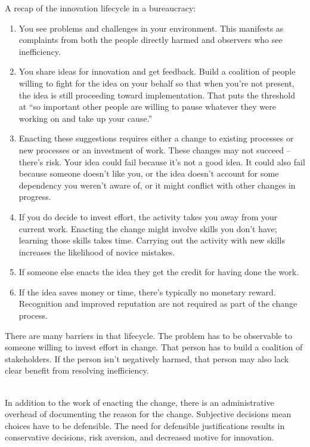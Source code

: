 A recap of the innovation lifecycle in a bureaucracy:
\begin{enumerate}
    \item You see problems and challenges in your environment. This manifests as complaints from both the people directly harmed and observers who see inefficiency.
    \item You share ideas for innovation and get feedback. Build a coalition of people willing to fight for the idea on your behalf
%
%
    so that when you're not present, the idea is still proceeding toward implementation.  That puts the threshold at ``so important other people are willing to pause whatever they were working on and take up your cause.''
    \item Enacting these suggestions requires either a change to existing processes or new processes or an investment of work. These changes may not succeed -- there's risk. Your idea could fail because it's not a good idea. It could also fail because someone doesn't like you, or the idea doesn't account for some dependency you weren't aware of, or it might conflict with other changes in progress.
    \item If you do decide to invest effort, the activity takes you away from your current work. Enacting the change might involve skills you don't have; learning those skills takes time. Carrying out the activity with new skills increases the likelihood of novice mistakes.
    \item If someone else enacts the idea they get the credit for having done the work.
    \item If the idea saves money or time, there's typically no monetary reward. Recognition and improved reputation are not required as part of the change process. 
\end{enumerate}

There are many barriers in that lifecycle. The problem has to be observable to someone willing to invest effort in change. That person has to build a coalition of stakeholders. If the person isn't negatively harmed, that person may also lack clear benefit from resolving inefficiency. 

\ \\

In addition to the work of enacting the change, there is an administrative overhead of documenting the reason for the change. 
Subjective decisions mean choices have to be defensible. 
The need for defensible justifications results in conservative decisions, risk aversion, and decreased motive for innovation. 


